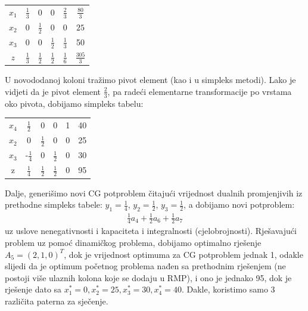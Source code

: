 \documentclass[a4paper, utf8, 11pt, colorlinks]{book}
\begin{document}
\begin{center}
	
	\begin{tabular}{ccccc|c}
		$x_1$ &     $\frac{1}{3}$  &   0 & 0  &      $ \frac{2}{3}$           & $\frac{80}{3}$ \\
		$x_2$ &     0              &  $\frac{1}{2}$  & 0     & 0                 &     $25$ \\
		$x_3$ &     0              &  0    &  $\frac{1}{2}$  & $ \frac{1}{3}$    & 50 \\ \hline
		$z$   &  $\frac{1}{3}$     &  $\frac{1}{2}$   &  $\frac{1}{2}$ &   $\frac{1}{6}$   & $\frac{305}{3}$ 
	\end{tabular}
\end{center}
U novododanoj koloni tražimo pivot element (kao i u simpleks metodi). Lako je vidjeti da je pivot element $\frac{2}{3}$, pa radeći elementarne transformacije po vrstama oko pivota, dobijamo simpleks tabelu:
\begin{center}
	\begin{tabular}{ccccc| c}
		  $x_4$ & $\frac{1}{2}$ & 0 & 0 & 1 & 40 \\
		  $x_2$ & 0 & $\frac{1}{2}$ & 0 & 0 & 25 \\
		  $x_3$ & -$\frac{1}{4}$ & 0 & $\frac{1}{2}$ & 0 & 30 \\ \hline
		  z  & $\frac{1}{4}$ & $\frac{1}{2}$ & $\frac{1}{2}$ & 0 & 95 
	\end{tabular}
\end{center}

Dalje, generišimo novi CG potproblem čitajući vrijednost dualnih promjenjivih iz prethodne simpleks tabele: $y_1 = \frac{1}{4}$, $y_2 = \frac{1}{2}$, $y_3= \frac{1}{2}$, a dobijamo novi potproblem:
\begin{align*}
	 \frac{1}{4} a_4 + \frac{1}{2} a_6 + \frac{1}{2} a_7
\end{align*}
uz uslove nenegativnosti i kapaciteta i integralnosti (cjelobrojnosti). Rješavajući problem uz pomoć dinamičkog problema, dobijamo optimalno rješenje $A_5 = (2,1,0)^T$, dok je vrijednost optimuma za CG potproblem jednak 1, odakle slijedi da je optimum početnog problema nađen sa prethodnim rješenjem (ne postoji više ulaznih kolona koje se dodaju u RMP), i ono je jednako 95, dok je rješenje dato sa $x_1^* = 0, x_2^* = 25, x_3^*=30, x_4^*= 40$. Dakle, koristimo samo 3 različita paterna za sječenje. 
\\ \vspace{1cm}
  
\end{document}
